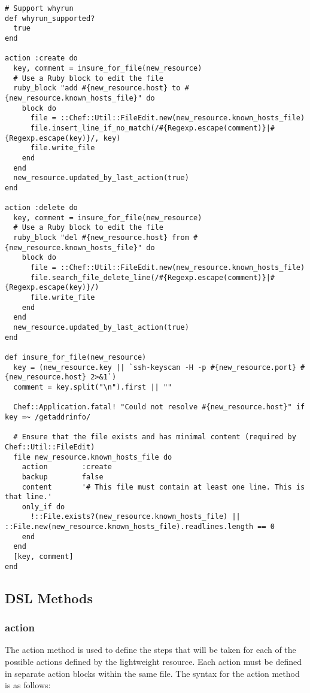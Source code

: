 \begin{lstlisting}[label=lst:cookbook-lwrp3,title=my-server-cloud/site-cookbooks/my\_cool\_app/providers/know\_host.rb]
# Support whyrun
def whyrun_supported?
  true
end

action :create do
  key, comment = insure_for_file(new_resource)
  # Use a Ruby block to edit the file
  ruby_block "add #{new_resource.host} to #{new_resource.known_hosts_file}" do
    block do
      file = ::Chef::Util::FileEdit.new(new_resource.known_hosts_file)
      file.insert_line_if_no_match(/#{Regexp.escape(comment)}|#{Regexp.escape(key)}/, key)
      file.write_file
    end
  end
  new_resource.updated_by_last_action(true)
end

action :delete do
  key, comment = insure_for_file(new_resource)
  # Use a Ruby block to edit the file
  ruby_block "del #{new_resource.host} from #{new_resource.known_hosts_file}" do
    block do
      file = ::Chef::Util::FileEdit.new(new_resource.known_hosts_file)
      file.search_file_delete_line(/#{Regexp.escape(comment)}|#{Regexp.escape(key)}/)
      file.write_file
    end
  end
  new_resource.updated_by_last_action(true)
end

def insure_for_file(new_resource)
  key = (new_resource.key || `ssh-keyscan -H -p #{new_resource.port} #{new_resource.host} 2>&1`)
  comment = key.split("\n").first || ""

  Chef::Application.fatal! "Could not resolve #{new_resource.host}" if key =~ /getaddrinfo/

  # Ensure that the file exists and has minimal content (required by Chef::Util::FileEdit)
  file new_resource.known_hosts_file do
    action        :create
    backup        false
    content       '# This file must contain at least one line. This is that line.'
    only_if do
      !::File.exists?(new_resource.known_hosts_file) || ::File.new(new_resource.known_hosts_file).readlines.length == 0
    end
  end
  [key, comment]
end
\end{lstlisting}

\subsection{DSL Methods}

\subsubsection{action}

The action method is used to define the steps that will be taken for each of the possible actions defined by the lightweight resource. Each action must be defined in separate action blocks within the same file. The syntax for the action method is as follows:


